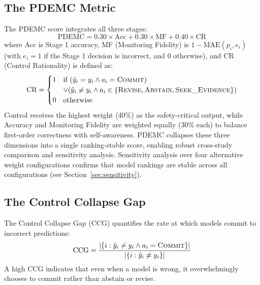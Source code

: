 \documentclass[11pt]{article}
\begin{document}
\subsection{The PDEMC Metric}
The PDEMC score integrates all three stages:
\begin{equation}
\text{PDEMC} = 0.30 \times \text{Acc} + 0.30 \times \text{MF} + 0.40 \times \text{CR}
\end{equation}
where Acc is Stage 1 accuracy, MF (Monitoring Fidelity) is $1 - \text{MAE}(p_i, e_i)$ (with $e_i = 1$ if the Stage 1 decision is incorrect, and $0$ otherwise), and CR (Control Rationality) is defined as:
\begin{equation}
\text{CR} = 
\begin{cases} 
1 & \text{if } (\hat{y}_i = y_i \wedge a_i = \textsc{Commit}) \\
  & \vee (\hat{y}_i \neq y_i \wedge a_i \in \{\textsc{Revise}, \textsc{Abstain}, \textsc{Seek\_Evidence}\}) \\
0 & \text{otherwise}
\end{cases}
\end{equation}
Control receives the highest weight (40\%) as the safety-critical output, while Accuracy and Monitoring Fidelity are weighted equally (30\% each) to balance first-order correctness with self-awareness. PDEMC collapses these three dimensions into a single ranking-stable score, enabling robust cross-study comparison and sensitivity analysis. Sensitivity analysis over four alternative weight configurations confirms that model rankings are stable across all configurations (see Section~\ref{sec:sensitivity}).

\subsection{The Control Collapse Gap}
The Control Collapse Gap (CCG) quantifies the rate at which models commit to incorrect predictions:
\begin{equation}
\text{CCG} = \frac{|\{i : \hat{y}_i \neq y_i \wedge a_i = \textsc{Commit}\}|}{|\{i : \hat{y}_i \neq y_i \}|}
\end{equation}
A high CCG indicates that even when a model is wrong, it overwhelmingly chooses to commit rather than abstain or revise.
\end{document}
